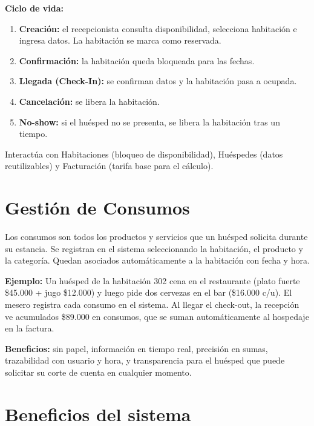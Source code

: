 \documentclass[12pt,a4paper]{article}
\begin{document}
\textbf{Ciclo de vida:}
\begin{enumerate}[leftmargin=*]
    \item \textbf{Creación:} el recepcionista consulta disponibilidad, selecciona habitación e ingresa datos. La habitación se marca como reservada.
    \item \textbf{Confirmación:} la habitación queda bloqueada para las fechas.
    \item \textbf{Llegada (Check-In):} se confirman datos y la habitación pasa a ocupada.
    \item \textbf{Cancelación:} se libera la habitación.
    \item \textbf{No-show:} si el huésped no se presenta, se libera la habitación tras un tiempo.
\end{enumerate}

Interactúa con Habitaciones (bloqueo de disponibilidad), Huéspedes (datos reutilizables) y Facturación (tarifa base para el cálculo).

\section{Gestión de Consumos}

Los consumos son todos los productos y servicios que un huésped solicita durante su estancia. Se registran en el sistema seleccionando la habitación, el producto y la categoría. Quedan asociados automáticamente a la habitación con fecha y hora.

\textbf{Ejemplo:} Un huésped de la habitación 302 cena en el restaurante (plato fuerte \$45.000 + jugo \$12.000) y luego pide dos cervezas en el bar (\$16.000 c/u). El mesero registra cada consumo en el sistema. Al llegar el check-out, la recepción ve acumulados \$89.000 en consumos, que se suman automáticamente al hospedaje en la factura.

\textbf{Beneficios:} sin papel, información en tiempo real, precisión en sumas, trazabilidad con usuario y hora, y transparencia para el huésped que puede solicitar su corte de cuenta en cualquier momento.

\section{Beneficios del sistema}
\end{document}
